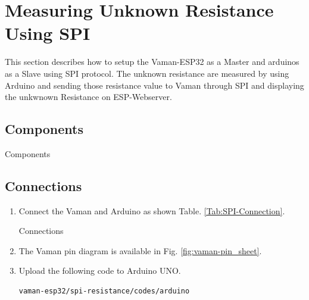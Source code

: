 \section{Measuring Unknown Resistance Using SPI}
This section describes how to setup the Vaman-ESP32 as a Master and  arduinos as a Slave using SPI protocol. The  unknown resistance are measured by using Arduino and sending those  resistance value to Vaman through SPI and displaying the unkwnown Resistance on ESP-Webserver.
\subsection{Components}
\begin{table}[!ht]
\centering

\caption{Components}
\label{table:SPI-components}
\end{table}

\subsection{Connections}
\begin{enumerate}[label=\thesection.\arabic*.,ref=\thesection.\theenumi]

\item
Connect the Vaman and Arduino as shown Table. \ref{Tab:SPI-Connection}.

\begin{table}[!ht]
\centering

\caption{Connections}
\label{Tab:SPI-Connection}
\end{table}
\item
The Vaman pin diagram is available in Fig. \ref{fig:vaman-pin_sheet}.

\item Upload the following code to Arduino UNO.
\begin{lstlisting}
vaman-esp32/spi-resistance/codes/arduino
\end{lstlisting}
\end{enumerate}
